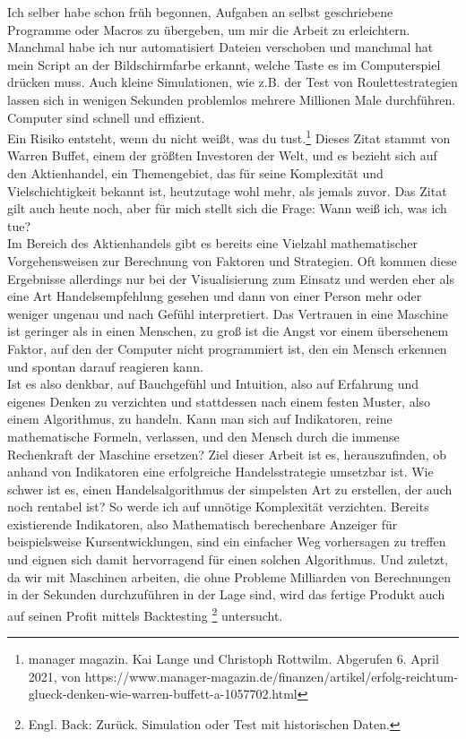 \documentclass[12pt]{article}
\begin{document}
	Ich selber habe schon früh begonnen, Aufgaben an selbst geschriebene Programme oder Macros zu übergeben, um mir die Arbeit zu erleichtern. Manchmal habe ich nur automatisiert Dateien verschoben und manchmal hat mein Script an der Bildschirmfarbe erkannt, welche Taste es im Computerspiel drücken muss. Auch kleine Simulationen, wie z.B. der Test von Roulettestrategien lassen sich in wenigen Sekunden problemlos mehrere Millionen Male durchführen. Computer sind schnell und effizient.\\
	\glqq Ein Risiko entsteht, wenn du nicht weißt, was du tust.\grqq{}\footnote{manager magazin. Kai Lange und Christoph Rottwilm. Abgerufen 6. April 2021, von https://www.manager-magazin.de/finanzen/artikel/erfolg-reichtum-glueck-denken-wie-warren-buffett-a-1057702.html} Dieses Zitat stammt von Warren Buffet, einem der größten Investoren der Welt, und es bezieht sich auf den Aktienhandel, ein Themengebiet, das für seine Komplexität und Vielschichtigkeit bekannt ist, heutzutage wohl mehr, als jemals zuvor. Das Zitat gilt auch heute noch, aber für mich stellt sich die Frage: Wann weiß ich, was ich tue?\\
	Im Bereich des Aktienhandels gibt es bereits eine Vielzahl mathematischer Vorgehensweisen zur Berechnung von Faktoren und Strategien. Oft kommen diese Ergebnisse allerdings nur bei der Visualisierung zum Einsatz und werden eher als eine Art Handelsempfehlung gesehen und dann von einer Person mehr oder weniger ungenau und nach Gefühl interpretiert. Das Vertrauen in eine Maschine ist geringer als in einen Menschen, zu groß ist die Angst vor einem übersehenem Faktor, auf den der Computer nicht programmiert ist, den ein Mensch erkennen und spontan darauf reagieren kann.\\
	Ist es also denkbar, auf Bauchgefühl und Intuition, also auf Erfahrung und eigenes Denken zu verzichten und stattdessen nach einem festen Muster, also einem Algorithmus, zu handeln. Kann man sich auf Indikatoren, reine mathematische Formeln, verlassen, und den Mensch durch die immense Rechenkraft der Maschine ersetzen? Ziel dieser Arbeit ist es, herauszufinden, ob anhand von Indikatoren eine erfolgreiche Handelsstrategie umsetzbar ist. Wie schwer ist es, einen Handelsalgorithmus der simpelsten Art zu erstellen, der auch noch rentabel ist? So werde ich auf unnötige Komplexität verzichten. Bereits existierende Indikatoren, also Mathematisch berechenbare Anzeiger für beispielsweise Kursentwicklungen, sind ein einfacher Weg vorhersagen zu treffen und eignen sich damit hervorragend für einen solchen Algorithmus. Und zuletzt, da wir mit Maschinen arbeiten, die ohne Probleme Milliarden von Berechnungen in der Sekunden durchzuführen in der Lage sind, wird das fertige Produkt auch auf seinen Profit mittels Backtesting \footnote{Engl. Back: Zurück. Simulation oder Test mit historischen Daten.} untersucht.
\end{document}
